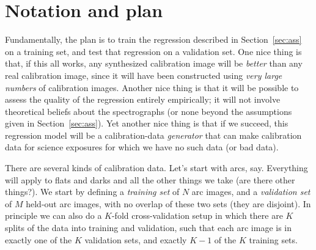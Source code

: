 \documentclass[modern]{aastex631}
\newcommand{\secref}[1]{Section~\ref{#1}}
\begin{document}
\section{Notation and plan}\label{sec:plan}\noindent
Fundamentally, the plan is to train the regression described in \secref{sec:ass} on a training set, and test that regression on a validation set.
One nice thing is that, if this all works, any synthesized calibration image will be \emph{better} than any real calibration image, since it will have been constructed using \emph{very large numbers} of calibration images.
Another nice thing is that it will be possible to assess the quality of the regression entirely empirically; it will not involve theoretical beliefs about the spectrographs (or none beyond the assumptions given in \secref{sec:ass}).
Yet another nice thing is that if we succeed, this regression model will be a calibration-data \emph{generator} that can make calibration data for science exposures for which we have no such data (or bad data).

There are several kinds of calibration data.
Let's start with arcs, say.
Everything will apply to flats and darks and all the other things we take (are there other things?).
We start by defining a \emph{training set} of $N$ arc images, and a \emph{validation set} of $M$ held-out arc images, with no overlap of these two sets (they are disjoint).
In principle we can also do a $K$-fold cross-validation setup in which there are $K$ splits of the data into training and validation, such that each arc image is in exactly one of the $K$ validation sets, and exactly $K-1$ of the $K$ training sets.
\end{document}
